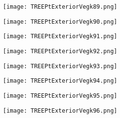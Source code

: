 \documentclass[pdf]{beamer}
\begin{document}
\begin{frame}
\begin{figure}[!h]
\centering
\texttt{[image: TREEPtExteriorVegk89.png]}
\end{figure}
\end{frame}

\begin{frame}
\begin{figure}[!h]
\centering
\texttt{[image: TREEPtExteriorVegk90.png]}
\end{figure}
\end{frame}

\begin{frame}
\begin{figure}[!h]
\centering
\texttt{[image: TREEPtExteriorVegk91.png]}
\end{figure}
\end{frame}

\begin{frame}
\begin{figure}[!h]
\centering
\texttt{[image: TREEPtExteriorVegk92.png]}
\end{figure}
\end{frame}

\begin{frame}
\begin{figure}[!h]
\centering
\texttt{[image: TREEPtExteriorVegk93.png]}
\end{figure}
\end{frame}

\begin{frame}
\begin{figure}[!h]
\centering
\texttt{[image: TREEPtExteriorVegk94.png]}
\end{figure}
\end{frame}

\begin{frame}
\begin{figure}[!h]
\centering
\texttt{[image: TREEPtExteriorVegk95.png]}
\end{figure}
\end{frame}

\begin{frame}
\begin{figure}[!h]
\centering
\texttt{[image: TREEPtExteriorVegk96.png]}
\end{figure}
\end{frame}
\end{document}
